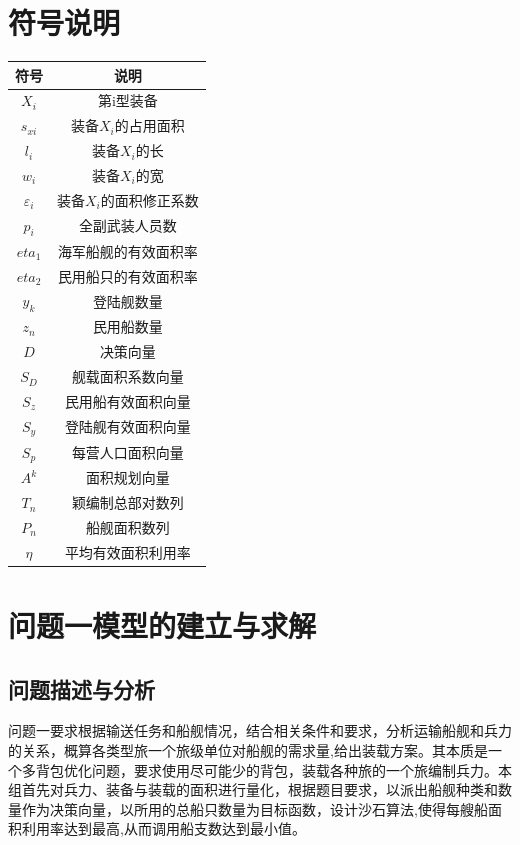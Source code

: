 \documentclass{whutmod}
\begin{document}
	
	\section{符号说明}
	\begin{table}[H]
	\label{biao} \centering

	\begin{tabular}{cc}
		\toprule[1.5pt]
		\multicolumn{1}{m{5cm}}{\centering 符号} & \multicolumn{1}{m{5cm}}{\centering 说明} \\
		\midrule[1pt]		
		$X_{i}$  &  第i型装备 \\ 
		$s_{xi}$  &  装备$X_{i}$的占用面积 \\ 
		$l_{i}$  & 装备$X_{i}$的长\\
		$w_{i}$  &  装备$X_{i}$的宽 \\ 
		$\varepsilon _{i}$ & 装备$X_{i}$的面积修正系数\\
		$p_{i}$	 &  全副武装人员数  \\ 
		$eta_{1}$ &  海军船舰的有效面积率 \\ 
		$eta_{2}$	 &  民用船只的有效面积率 \\ 
		$y_{k}$  &   登陆舰数量\\ 
		$z_{n}$  &  民用船数量\\	
		$D$ & 决策向量\\
		$S_{D}$ &  舰载面积系数向量\\ 
		$S_{z}$ & 民用船有效面积向量\\
		$S_{y}$ & 登陆舰有效面积向量\\
		$S_{p}$ & 每营人口面积向量\\
		$A^{k}$  & 面积规划向量\\
		$T_{n}$ & 颖编制总部对数列\\
		$P_{n}$ & 船舰面积数列\\
		$\eta $ &  平均有效面积利用率\\

		\bottomrule[1.5pt]
	\end{tabular}
\end{table}

	\section{问题一模型的建立与求解}

    \subsection{问题描述与分析}

    问题一要求根据输送任务和船舰情况，结合相关条件和要求，分析运输船舰和兵力的关系，概算各类型旅一个旅级单位对船舰的需求量,给出装载方案。其本质是一个多背包优化问题，要求使用尽可能少的背包，装载各种旅的一个旅编制兵力。本组首先对兵力、装备与装载的面积进行量化，根据题目要求，以派出船舰种类和数量作为决策向量，以所用的总船只数量为目标函数，设计沙石算法,使得每艘船面积利用率达到最高,从而调用船支数达到最小值。
    
\end{document}
